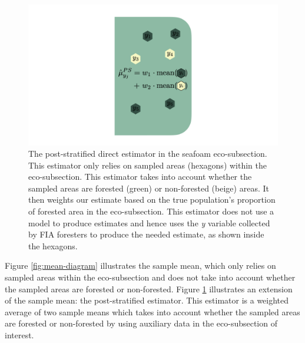 \documentclass[12pt,twoside]{reedthesis}
\begin{document}
\clearpage
\begin{figure}

{\centering \includegraphics[width=1\linewidth]{figure/ps-diagram} 

}

\caption[The post-stratified direct estimator]{The post-stratified direct estimator in the seafoam eco-subsection. This estimator only relies on sampled areas (hexagons) within the eco-subsection. This estimator takes into account whether the sampled areas are forested (green) or non-forested (beige) areas. It then weights our estimate based on the true population's proportion of forested area in the eco-subsection. This estimator does not use a model to produce estimates and hence uses the \textit{y} variable collected by FIA foresters to produce the needed estimate, as shown inside the hexagons.}\label{fig:ps-diagram}
\end{figure}
Figure \ref{fig:mean-diagram} illustrates the sample mean, which only relies on sampled areas within the eco-subsection and does not take into account whether the sampled areas are forested or non-forested. Figure \ref{fig:ps-diagram} illustrates an extension of the sample mean: the post-stratified estimator. This estimator is a weighted average of two sample means which takes into account whether the sampled areas are forested or non-forested by using auxiliary data in the eco-subsection of interest.
\end{document}
